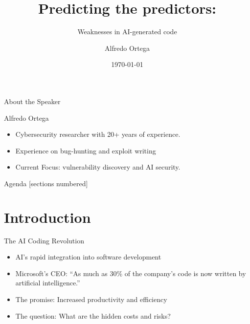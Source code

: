 \documentclass[aspectratio=169]{beamer}
\title{Predicting the predictors:}
\subtitle{Weaknesses in AI-generated code}
\author{Alfredo Ortega}
\institute{neuroengine.ai\\
\texttt{alfred@neuroengine.ai}}
\date{\today}
\begin{document}
\maketitle

\begin{frame}{About the Speaker}
\begin{center}
Alfredo Ortega\\
\end{center}
\vspace{0.5cm}
\begin{itemize}
    \item Cybersecurity researcher with 20+ years of experience.
    \item Experience on bug-hunting and exploit writing
    \item Current Focus: vulnerability discovery and AI security.
\end{itemize}
\end{frame}

\begin{frame}{Agenda}
[sections numbered]
\tableofcontents[hideallsubsections]
\end{frame}

\section{Introduction}
\begin{frame}{The AI Coding Revolution}
\begin{itemize}
    \item AI's rapid integration into software development
    \item \alert{Microsoft's CEO}: ``As much as 30\% of the company's code is now written by artificial intelligence.''
    \item The promise: Increased productivity and efficiency
    \item The question: What are the hidden costs and risks?
\end{itemize}
\end{frame}
\end{document}
